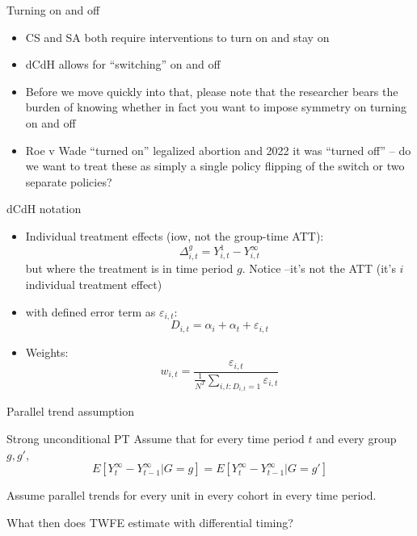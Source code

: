 \documentclass{beamer}
\begin{document}
\begin{frame}{Turning on and off}

\begin{itemize}
\item CS and SA both require interventions to turn on and stay on
\item dCdH allows for ``switching'' on and off 
\item Before we move quickly into that, please note that the researcher bears the burden of knowing whether in fact you want to impose symmetry on turning on and off
\item Roe v Wade ``turned on'' legalized abortion and 2022 it was ``turned off'' -- do we want to treat these as simply a single policy flipping of the switch or two separate policies?
\end{itemize}

\end{frame}

\begin{frame}{dCdH notation}

\begin{itemize}
\item Individual treatment effects (iow, not the group-time ATT): $$\Delta^g_{i,t} = Y^1_{i,t} - Y^\infty_{i,t}$$ but where the treatment is in time period $g$. Notice --it's not the ATT (it's $i$ individual treatment effect)
\item with defined error term as $\varepsilon_{i,t}$: $$D_{i,t} = \alpha_i + \alpha_t + \varepsilon_{i,t}$$
\item Weights: $$w_{i,t} = \frac{\varepsilon_{i,t}}{\frac{1}{N^T} \sum_{i,t:D_{i,t}=1} \varepsilon_{i,t}}$$
\end{itemize}

\end{frame}

\begin{frame}{Parallel trend assumption}

\begin{block}{Strong unconditional PT}
Assume that for every time period $t$ and every group $g,g'$, $$E[Y^\infty_t - Y^\infty_{t-1}|G=g] = E[Y^\infty_t - Y^\infty_{t-1}|G=g'] $$
\end{block}Assume parallel trends for every unit in every cohort in every time period.

\bigskip

What then does TWFE estimate with differential timing?

\end{frame}
\end{document}

